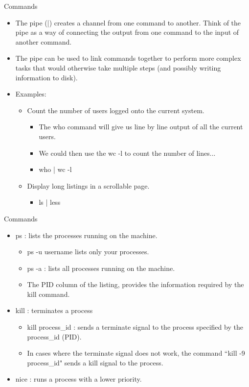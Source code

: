 \documentclass{beamer}
\begin{document}
\begin{frame}{Commands}
\begin{itemize}
\item The pipe (|) creates a channel from one command to another. Think of the pipe as a way of connecting the output from one command to the input of another command.
\item The pipe can be used to link commands together to perform more complex tasks that would otherwise take multiple steps (and possibly writing information to disk).
\item Examples:
\begin{itemize}
\item Count the number of users logged onto the current system.
\begin{itemize}
\item The who command will give us line by line output of all the current users.
\item We could then use the wc -l to count the number of lines...
\item who | wc -l
\end{itemize}
\item Display long listings in a scrollable page.
\begin{itemize}
\item ls | less
\end{itemize}
\end{itemize}
\end{itemize}
\end{frame}

\begin{frame}{Commands}
\begin{itemize}
\item ps : lists the processes running on the machine. 
\begin{itemize}
\item ps -u username lists only your processes. 
\item ps -a : lists all processes running on the machine.
\item The PID column of the listing, provides the information required by the kill command.
\end{itemize}
\item kill : terminates a process
\begin{itemize}
\item kill process\_id : sends a terminate signal to the process specified by the process\_id (PID).
\item In cases where the terminate signal does not work, the command ``kill -9 process\_id" sends a kill signal to the process.
\end{itemize}
\item nice : runs a process with a lower priority.
\end{itemize}
\end{frame}
\end{document}
